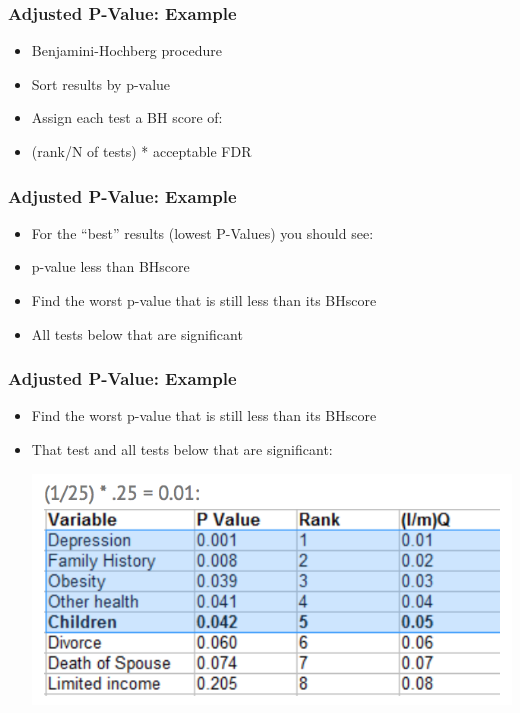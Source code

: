 \documentclass[14pt,handout]{beamer}
\begin{document}
\begin{frame}
\frametitle{Adjusted P-Value: Example}
\begin{itemize}
	\item<+-> Benjamini-Hochberg procedure
	\item<+-> Sort results by p-value
	\item<+-> Assign each test a BH score of:
	\item<+-> (rank/N of tests) * acceptable FDR
\end{itemize}
\end{frame}

\begin{frame}
\frametitle{Adjusted P-Value: Example}
\begin{itemize}
	\item<+-> For the ``best'' results (lowest P-Values) you should see:
	\item<+-> p-value less than BHscore
	\item<+-> Find the worst p-value that is still less than its BHscore
	\item<+-> All tests below that are significant
\end{itemize}
\end{frame}

\begin{frame}
\frametitle{Adjusted P-Value: Example}
\begin{itemize}
	\item Find the worst p-value that is still less than its BHscore
	\item That test and all tests below that are significant:
	\begin{center}
	\includegraphics[width=.7\textwidth]{images_20171128_BHscore.png}
	\end{center}
\end{itemize}
\end{frame}

\end{document}
